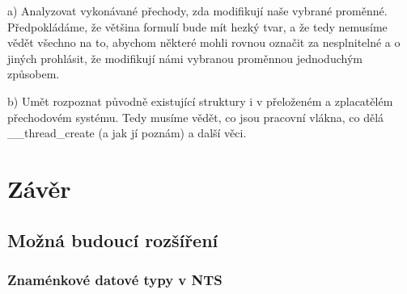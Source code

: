 \documentclass[10pt,a4paper,notitlepage]{report}
\begin{document}
a) Analyzovat vykonávané přechody, zda modifikují naše vybrané proměnné. Předpokládáme, že většina formulí bude mít hezký tvar, a že tedy nemusíme vědět všechno na to, abychom některé mohli rovnou označit za nesplnitelné a o jiných prohlásit, že modifikují námi vybranou proměnnou jednoduchým způsobem.

b) Umět rozpoznat původně existující struktury i v přeloženém a zplacatělém přechodovém systému. Tedy musíme vědět, co jsou pracovní vlákna, co dělá \_\_thread\_create (a jak jí poznám) a další věci.

\chapter{Závěr}
\section{Možná budoucí rozšíření}

\subsection{Znaménkové datové typy v NTS}


\tableofcontents

\printbibliography
\end{document}
